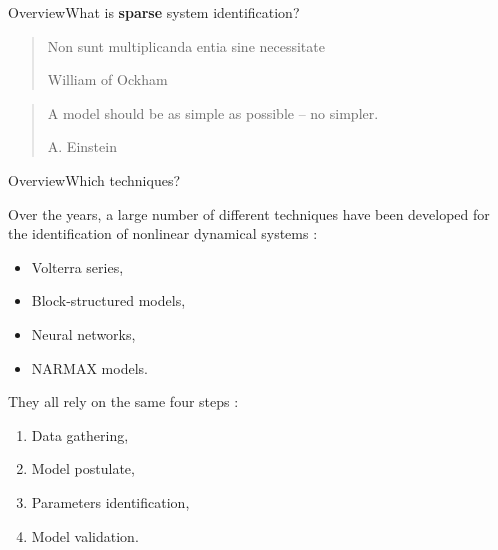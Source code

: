 \documentclass[usenames,dvipsnames,svgnames,10pt,aspectratio=169]{beamer}
\begin{document}
\begin{frame}[t, c]{Overview}{What is \textbf{sparse} system identification?}

		\centering

		\begin{quote}
			Non sunt multiplicanda entia sine necessitate
			\\
			\begin{flushright}William of Ockham\end{flushright}
		\end{quote}

		\vspace{1cm}

		\begin{quote}
			A model should be as simple as possible -- no simpler.
			\\
			\begin{flushright}A. Einstein\end{flushright}
		\end{quote}

\end{frame}

\begin{frame}[t, c]{Overview}{Which techniques?}

	Over the years, a large number of different techniques have been developed for the identification of nonlinear dynamical systems :

	\begin{multicols}{2}
		\begin{itemize}
			\item Volterra series,
			\item Block-structured models,
			\item Neural networks,
			\item NARMAX models.
		\end{itemize}
	\end{multicols}

	\bigskip

	They all rely on the same four steps :
	\begin{multicols}{2}
		\begin{enumerate}
			\item Data gathering,
			\item Model postulate,
			\item Parameters identification,
			\item Model validation.
		\end{enumerate}
	\end{multicols}

\end{frame}
\end{document}
